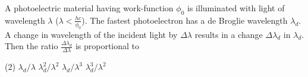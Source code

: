 
    \item A photoelectric material having work-function \(\phi_0\) is illuminated with light of wavelength \(\lambda\) (\(\lambda < \frac{hc}{\phi_0}\)). The fastest photoelectron has a de Broglie wavelength \(\lambda_d\). A change in wavelength of the incident light by \(\Delta \lambda\) results in a change \(\Delta \lambda_d\) in \(\lambda_d\). Then the ratio \(\frac{\Delta \lambda_d}{\Delta \lambda}\) is proportional to
        \begin{tasks}(2)
            \task \(\lambda_d / \lambda\)
            \task \(\lambda_d^2 / \lambda^2\)
            \task \(\lambda_d / \lambda^3\)
            \task \(\lambda_d^3 / \lambda^2\)
        \end{tasks}

